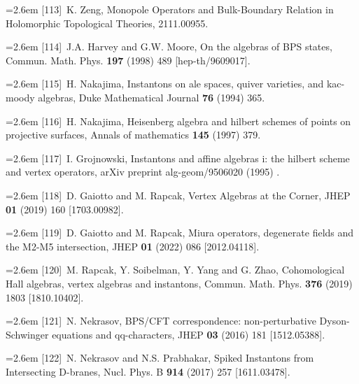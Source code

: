 \par\noindent\hangindent=2.6em [113]~K. Zeng, Monopole Operators and Bulk-Boundary Relation in Holomorphic Topological Theories, 2111.00955.

\par\noindent\hangindent=2.6em [114]~J.A. Harvey and G.W. Moore, On the algebras of BPS states, Commun. Math. Phys. \textbf{197} (1998) 489 [hep-th/9609017].

\par\noindent\hangindent=2.6em [115]~H. Nakajima, Instantons on ale spaces, quiver varieties, and kac-moody algebras, Duke Mathematical Journal \textbf{76} (1994) 365.

\par\noindent\hangindent=2.6em [116]~H. Nakajima, Heisenberg algebra and hilbert schemes of points on projective surfaces, Annals of mathematics \textbf{145} (1997) 379.

\par\noindent\hangindent=2.6em [117]~I. Grojnowski, Instantons and affine algebras i: the hilbert scheme and vertex operators, arXiv preprint alg-geom/9506020 (1995) .

\par\noindent\hangindent=2.6em [118]~D. Gaiotto and M. Rapcak, Vertex Algebras at the Corner, JHEP \textbf{01} (2019) 160 [1703.00982].

\par\noindent\hangindent=2.6em [119]~D. Gaiotto and M. Rapcak, Miura operators, degenerate fields and the M2-M5 intersection, JHEP \textbf{01} (2022) 086 [2012.04118].

\par\noindent\hangindent=2.6em [120]~M. Rapcak, Y. Soibelman, Y. Yang and G. Zhao, Cohomological Hall algebras, vertex algebras and instantons, Commun. Math. Phys. \textbf{376} (2019) 1803 [1810.10402].

\par\noindent\hangindent=2.6em [121]~N. Nekrasov, BPS/CFT correspondence: non-perturbative Dyson-Schwinger equations and qq-characters, JHEP \textbf{03} (2016) 181 [1512.05388].


\par\noindent\hangindent=2.6em [122]~N. Nekrasov and N.S. Prabhakar, Spiked Instantons from Intersecting D-branes, Nucl. Phys. B \textbf{914} (2017) 257 [1611.03478].

